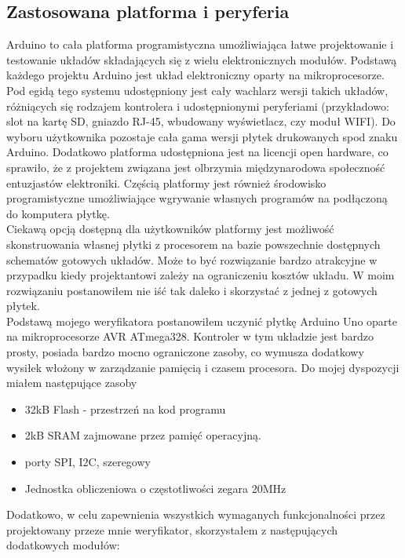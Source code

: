 \documentclass[declaration,shortabstract, mgr]{iithesis}
\begin{document}
\subsection{Zastosowana platforma i peryferia}
\indent Arduino to cała platforma programistyczna umożliwiająca łatwe projektowanie i testowanie układów składających się z wielu elektronicznych modułów. Podstawą każdego projektu Arduino jest układ elektroniczny oparty na mikroprocesorze. Pod egidą tego systemu udostępniony jest cały wachlarz wersji takich układów, różniących się rodzajem kontrolera i udostępnionymi peryferiami (przykładowo: slot na kartę SD, gniazdo RJ-45, wbudowany wyświetlacz, czy moduł WIFI). Do wyboru użytkownika pozostaje cała gama wersji płytek drukowanych spod znaku Arduino. Dodatkowo platforma udostępniona jest na licencji open hardware, co sprawiło, że z projektem związana jest olbrzymia międzynarodowa społeczność entuzjastów elektroniki. Częścią platformy jest również środowisko programistyczne umożliwiające wgrywanie własnych programów na podłączoną do komputera płytkę.\\
\indent Ciekawą opcją dostępną dla użytkowników platformy jest możliwość skonstruowania własnej płytki z procesorem na bazie powszechnie dostępnych schematów gotowych układów. Może to być rozwiązanie bardzo atrakcyjne w przypadku kiedy projektantowi zależy na ograniczeniu kosztów układu. W moim rozwiązaniu postanowiłem nie iść tak daleko i skorzystać z jednej z gotowych płytek.\\
\indent Podstawą mojego weryfikatora postanowiłem uczynić płytkę Arduino Uno oparte na mikroprocesorze AVR ATmega328. Kontroler w tym układzie jest bardzo prosty, posiada bardzo mocno ograniczone zasoby, co wymusza dodatkowy wysiłek włożony w zarządzanie pamięcią i czasem procesora. Do mojej dyspozycji miałem następujące zasoby\\
\begin{itemize}
\item 32kB Flash - przestrzeń na kod programu
\item 2kB SRAM zajmowane przez pamięć operacyjną.
\item porty SPI, I2C, szeregowy
\item Jednostka obliczeniowa o częstotliwości zegara 20MHz
\end{itemize}
\indent Dodatkowo, w celu zapewnienia wszystkich wymaganych funkcjonalności przez projektowany przeze mnie weryfikator, skorzystałem z następujących dodatkowych modułów:
\end{document}
